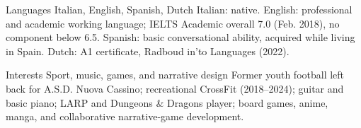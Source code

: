 
\begin{cventries}
\cventry
  {Languages}
  {Italian, English, Spanish, Dutch}
  {}
  {}
  {Italian: native. English: professional and academic working language; IELTS Academic overall 7.0 (Feb. 2018), no component below 6.5. Spanish: basic conversational ability, acquired while living in Spain. Dutch: A1 certificate, Radboud in'to Languages (2022).}

\cventry
  {Interests}
  {Sport, music, games, and narrative design}
  {}
  {}
  {Former youth football left back for A.S.D. Nuova Cassino; recreational CrossFit (2018--2024); guitar and basic piano; LARP and Dungeons \& Dragons player; board games, anime, manga, and collaborative narrative-game development.}
\end{cventries}
